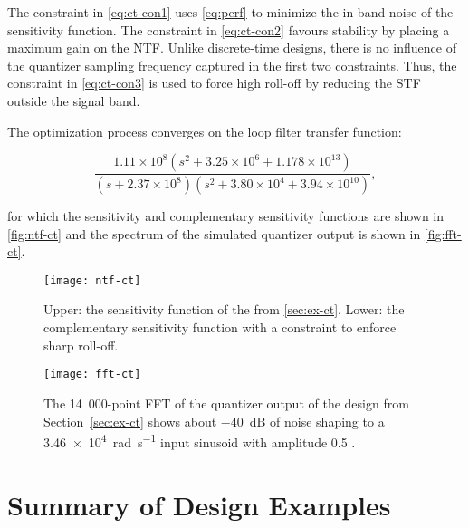 The constraint in \autoref{eq:ct-con1} uses \autoref{eq:perf} to minimize the in-band noise of the sensitivity function. The constraint in \autoref{eq:ct-con2} favours stability by placing a maximum gain on the \gls{NTF}. Unlike discrete-time designs, there is no influence of the quantizer sampling frequency captured in the first two constraints. Thus, the constraint in \autoref{eq:ct-con3} is used to force high roll-off by reducing the \gls{STF} outside the signal band.

The optimization process converges on the loop filter transfer function:

\begin{equation*}
	\frac{1.11\times10^8\left(s^2 + 3.25\times10^6 + 1.178\times10^{13}\right)}{\left(s + 2.37\times10^8\right)\left(s^2 + 3.80\times10^4 + 3.94\times10^{10}\right)},
\end{equation*}

for which the sensitivity and complementary sensitivity functions are shown in \autoref{fig:ntf-ct} and the spectrum of the simulated quantizer output is shown in \autoref{fig:fft-ct}.

\begin{figure}
	\centering
	\texttt{[image: ntf-ct]}
	\caption{Upper: the sensitivity function of the  from \autoref{sec:ex-ct}. Lower: the complementary sensitivity function with a  constraint to enforce sharp roll-off.} \label{fig:ntf-ct}
\end{figure}

\begin{figure}
	\centering
	\texttt{[image: fft-ct]}
	\caption{The 14~000-point FFT of the quantizer output of the  design from Section~\ref{sec:ex-ct} shows about \SI{-40}{\deci\bel} of noise shaping to a \SI{3.46e4}{\radian\per\second} input sinusoid with amplitude 0.5 .} \label{fig:fft-ct}
\end{figure}

\section{Summary of Design Examples}
\label{sec:ex-compare}

